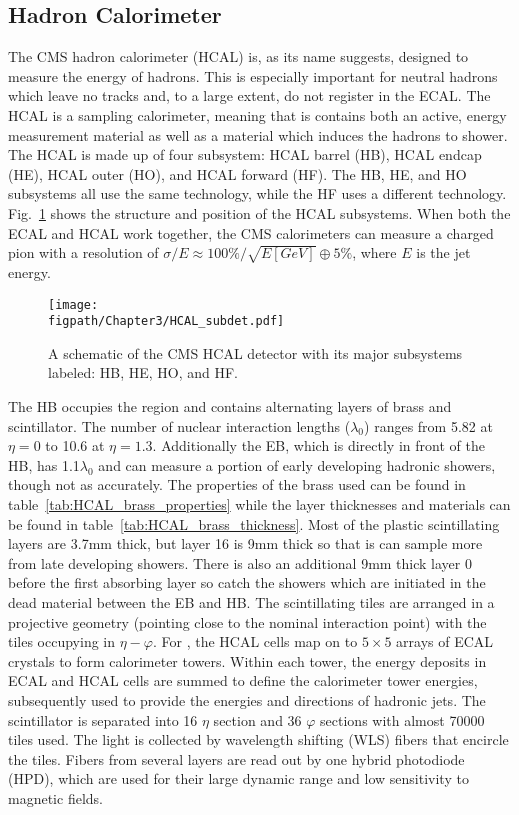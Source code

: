 \subsection{Hadron Calorimeter}
\label{sec:hadron_calorimeter}

The CMS hadron calorimeter (HCAL) is, as its name suggests, designed to measure the energy of hadrons.
This is especially important for neutral hadrons which leave no tracks and, to a large extent, do not register in the ECAL.
The HCAL is a sampling calorimeter, meaning that is contains both an active, energy measurement material as well as a material which induces the hadrons to shower.
The HCAL is made up of four subsystem: HCAL barrel (HB), HCAL endcap (HE), HCAL outer (HO), and HCAL forward (HF).
The HB, HE, and HO subsystems all use the same technology, while the HF uses a different technology.
Fig.~\ref{fig:CMS_HCAL} shows the structure and position of the HCAL subsystems.
When both the ECAL and HCAL work together, the CMS calorimeters can measure a charged pion with a resolution of $\sigma/E\approx100\%/\sqrt{E[GeV]}\oplus5\%$, where $E$ is the jet energy.

\begin{figure}[!hbt]
    \centering
    \texttt{[image: \\figpath/Chapter3/HCAL\_subdet.pdf]}
    \caption{A schematic of the CMS HCAL detector with its major subsystems labeled: HB, HE, HO, and HF.}
    \label{fig:CMS_HCAL}
\end{figure}

The HB occupies the region  and contains alternating layers of brass and scintillator.
The number of nuclear interaction lengths ($\lambda_{0}$) ranges from 5.82 at $\eta=0$ to 10.6 at $\eta=1.3$.
Additionally the EB, which is directly in front of the HB, has 1.1$\lambda_{0}$ and can measure a portion of early developing hadronic showers, though not as accurately.
The properties of the brass used can be found in table~\ref{tab:HCAL_brass_properties} while the layer thicknesses and materials can be found in table~\ref{tab:HCAL_brass_thickness}.
Most of the plastic scintillating layers are 3.7\unit{mm} thick, but layer 16 is 9\unit{mm} thick so that is can sample more from late developing showers.
There is also an additional 9\unit{mm} thick layer 0 before the first absorbing layer so catch the showers which are initiated in the dead material between the EB and HB.
The scintillating tiles are arranged in a projective geometry (pointing close to the nominal interaction point) with the tiles occupying  in $\eta-\varphi$.
For , the HCAL cells map on to $5\times5$ arrays of ECAL crystals to form calorimeter towers.
Within each tower, the energy deposits in ECAL and HCAL cells are summed to define the calorimeter tower energies, subsequently used to provide the energies and directions of hadronic jets.
The scintillator is separated into 16 $\eta$ section and 36 $\varphi$ sections with almost 70000 tiles used.
The light is collected by wavelength shifting (WLS) fibers that encircle the tiles.
Fibers from several layers are read out by one hybrid photodiode (HPD), which are used for their large dynamic range and low sensitivity to magnetic fields.

